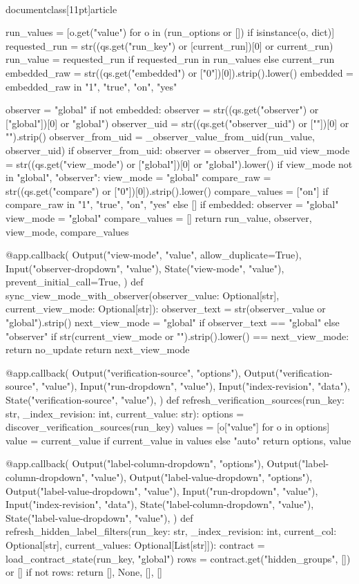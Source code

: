 \\documentclass[11pt]{article}
\begin{document}
\begin{CodeBlock}
{{{{{{{{    run_values = [o.get("value") for o in (run_options or []) if isinstance(o, dict)]
    requested_run = str((qs.get("run_key") or [current_run])[0] or current_run)
    run_value = requested_run if requested_run in run_values else current_run
    embedded_raw = str((qs.get("embedded") or ["0"])[0]).strip().lower()
    embedded = embedded_raw in {"1", "true", "on", "yes"}

    observer = "global"
    if not embedded:
        observer = str((qs.get("observer") or ["global"])[0] or "global")
        observer_uid = str((qs.get("observer_uid") or [""])[0] or "").strip()
        observer_from_uid = _observer_value_from_uid(run_value, observer_uid)
        if observer_from_uid:
            observer = observer_from_uid
    view_mode = str((qs.get("view_mode") or ["global"])[0] or "global").lower()
    if view_mode not in {"global", "observer"}:
        view_mode = "global"
    compare_raw = str((qs.get("compare") or ["0"])[0]).strip().lower()
    compare_values = ["on"] if compare_raw in {"1", "true", "on", "yes"} else []
    if embedded:
        observer = "global"
        view_mode = "global"
        compare_values = []
    return run_value, observer, view_mode, compare_values


@app.callback(
    Output("view-mode", "value", allow_duplicate=True),
    Input("observer-dropdown", "value"),
    State("view-mode", "value"),
    prevent_initial_call=True,
)
def sync_view_mode_with_observer(observer_value: Optional[str], current_view_mode: Optional[str]):
    observer_text = str(observer_value or "global").strip()
    next_view_mode = "global" if observer_text == "global" else "observer"
    if str(current_view_mode or "").strip().lower() == next_view_mode:
        return no_update
    return next_view_mode


@app.callback(
    Output("verification-source", "options"),
    Output("verification-source", "value"),
    Input("run-dropdown", "value"),
    Input("index-revision", "data"),
    State("verification-source", "value"),
)
def refresh_verification_sources(run_key: str, _index_revision: int, current_value: str):
    options = discover_verification_sources(run_key)
    values = [o["value"] for o in options]
    value = current_value if current_value in values else "auto"
    return options, value


@app.callback(
    Output("label-column-dropdown", "options"),
    Output("label-column-dropdown", "value"),
    Output("label-value-dropdown", "options"),
    Output("label-value-dropdown", "value"),
    Input("run-dropdown", "value"),
    Input("index-revision", "data"),
    State("label-column-dropdown", "value"),
    State("label-value-dropdown", "value"),
)
def refresh_hidden_label_filters(run_key: str, _index_revision: int, current_col: Optional[str], current_values: Optional[List[str]]):
    contract = load_contract_state(run_key, "global")
    rows = contract.get("hidden_groups", []) or []
    if not rows:
        return [], None, [], []

}}}}}}}}
\end{CodeBlock}
\end{document}

